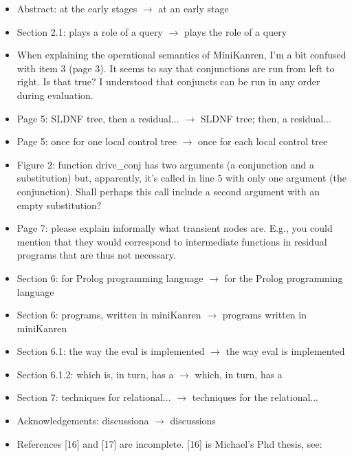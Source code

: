 \begin{itemize}
  \item Abstract: at the early stages $\rightarrow$ at an early stage
  \item Section 2.1: plays a role of a query $\rightarrow$ plays the role of a query
  \item When explaining the operational semantics of MiniKanren, I'm a bit
  confused with item 3 (page 3). It seems to say that conjunctions are
  run from left to right. Is that true? I understood that conjuncts
  can be run in any order during evaluation.

  \item Page 5: SLDNF tree, then a residual... $\rightarrow$ SLDNF tree; then, a residual...
  \item Page 5: once for one local control tree $\rightarrow$ once for each local control tree
  \item Figure 2: function drive_conj has two arguments (a conjunction
  and a substitution) but, apparently, it's called in line 5 with only
  one argument (the conjunction). Shall perhaps this call include a second
  argument with an empty substitution?

  \item Page 7: please explain informally what transient nodes are. E.g., you
  could mention that they would correspond to intermediate functions in
  residual programs that are thus not necessary.
  \item Section 6: for Prolog programming language $\rightarrow$ for the Prolog
  programming language
  \item Section 6: programs, written in miniKanren $\rightarrow$ programs written in miniKanren
  \item Section 6.1: the way the eval is implemented $\rightarrow$ the way eval is implemented
  \item Section 6.1.2: which is, in turn, has a $\rightarrow$ which, in turn, has a
  \item Section 7: techniques for relational... $\rightarrow$ techniques for the relational...
  \item Acknowledgements: discussiona $\rightarrow$ discussions
  \item References [16] and [17] are incomplete. [16] is Michael's Phd thesis, see:


\end{itemize}
